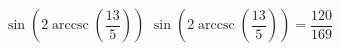  {$\sin\left(2\operatorname{arccsc}\left(\dfrac{13}{5}\right)\right)$}
{ $\sin\left(2\operatorname{arccsc}\left(\dfrac{13}{5}\right)\right) = \dfrac{120}{169}$}
